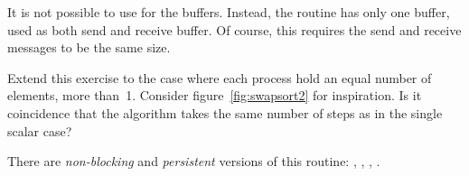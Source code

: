 \begin{remark}
  It is not possible to use  for the buffers.
  Instead, the routine  has only one buffer,
  used as both send and receive buffer.
  Of course, this requires the send and receive messages to be the same size.
\end{remark}

\begin{exercise}
  Extend this exercise to the case where each process hold an equal
  number of elements, more than~1. Consider figure~\ref{fig:swapsort2}
  for inspiration. Is it coincidence that the algorithm takes the same
  number of steps as in the single scalar case?
\end{exercise}

\begin{mpifour}
  There are
  \emph{non-blocking}
  and
  \emph{persistent}
  versions of this routine:
  , ,
  , .
\end{mpifour}
